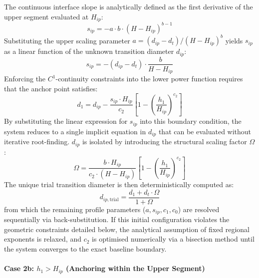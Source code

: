 \documentclass[twocolumn, bibliography=totoc]{scrartcl}
\begin{document}
The continuous interface slope is analytically defined as the first derivative of the upper segment evaluated at $H_{ip}$:
\begin{equation}
    s_{ip} = -a \cdot b \cdot (H - H_{ip})^{b-1}
\end{equation}
Substituting the upper scaling parameter $a = (d_{ip} - d_t) / (H - H_{ip})^b$ yields $s_{ip}$ as a linear function of the unknown transition diameter $d_{ip}$:
\begin{equation}
    s_{ip} = -(d_{ip} - d_t) \cdot \frac{b}{H - H_{ip}}
\end{equation}
Enforcing the $C^1$-continuity constraints into the lower power function requires that the anchor point satisfies:
\begin{equation}
    d_1 = d_{ip} - \frac{s_{ip} \cdot H_{ip}}{c_2} \left[ 1 - \left( \frac{h_1}{H_{ip}} \right)^{c_2} \right]
\end{equation}
By substituting the linear expression for $s_{ip}$ into this boundary condition, the system reduces to a single implicit equation in $d_{ip}$ that can be evaluated without iterative root-finding. $d_{ip}$ is isolated by introducing the structural scaling factor $\Omega$:
\begin{equation}
    \Omega = \frac{b \cdot H_{ip}}{c_2 \cdot (H - H_{ip})} \left[ 1 - \left( \frac{h_1}{H_{ip}} \right)^{c_2} \right]
\end{equation}
The unique trial transition diameter is then deterministically computed as:
\begin{equation}
    d_{ip,\text{trial}} = \frac{d_1 + d_t \cdot \Omega}{1 + \Omega}
\end{equation}
from which the remaining profile parameters ($a, s_{ip}, c_1, c_0$) are resolved sequentially via back-substitution. If this initial configuration violates the geometric constraints detailed below, the analytical assumption of fixed regional exponents is relaxed, and $c_2$ is optimised numerically via a bisection method until the system converges to the exact baseline boundary.

\paragraph{Case 2b: $h_1 > H_{ip}$ (Anchoring within the Upper Segment)}
\end{document}
